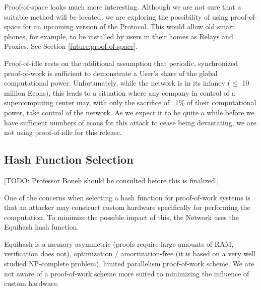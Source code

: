 Proof-of-space looks much more interesting. Although we are not sure that a suitable method will be located, we are exploring the possibility of using proof-of-space for an upcoming version of the \Orchid{} Protocol. This would allow old smart phones, for example, to be installed by users in their homes as Relays and Proxies. See Section \ref{future:proof-of-space}.

Proof-of-idle rests on the additional assumption that periodic, synchronized proof-of-work is sufficient to demonstrate a User’s share of the global computational power. Unfortunately, while the network is in its infancy ($\leq$ 10 million Econs), this leads to a situation where any company in control of a supercomputing center may, with only the sacrifice of ~1\% of their computational power, take control of the network. As we expect it to be quite a while before we have sufficient numbers of econs for this attack to cease being devastating, we are not using proof-of-idle for this release.

\subsection{Hash Function Selection}

[TODO: Professor Boneh should be consulted before this is finalized.]

One of the concerns when selecting a hash function for proof-of-work
systems is that an attacker may construct custom hardware specifically
for performing the computation. To minimize the possible impact of
this, the \Orchid{} Network uses the Equihash hash function\cite{Equihash}.

Equihash is a memory-asymmetric (proofs require large amounts of RAM,
verification does not), optimization / amortization-free (it is based on
a very well studied NP-complete problem), limited parallelism
proof-of-work scheme. We are not aware of a proof-of-work scheme more
suited to minimizing the influence of custom hardware.
